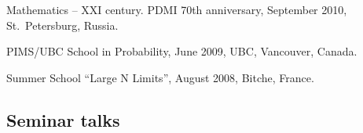 \documentclass[letterpaper,11pt]{article}
\begin{document}
\begin{etaremune}
\item Mathematics -- XXI century. PDMI 70th anniversary, September 2010, St.~Petersburg, Russia.




\item PIMS/UBC School in Probability, June 2009, UBC, Vancouver, Canada. 

\item 
Summer School ``Large N Limits'', August 2008, Bitche, France. 
\end{etaremune}


\subsection*{Seminar talks}
\end{document}
